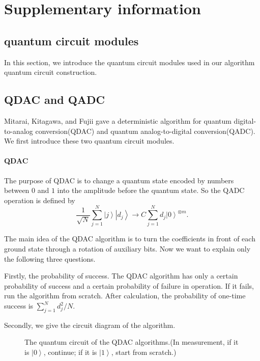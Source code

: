 \documentclass[%
 reprint,
 amsmath,amssymb,
pra,
]{revtex4-1}
\begin{document}
\clearpage

\section{Supplementary information}
\subsection{quantum circuit modules}
In this section, we introduce the quantum circuit modules used in our algorithm quantum circuit construction.


\subsection{QDAC and QADC}
Mitarai, Kitagawa, and Fujii \cite{mitarai2019quantum} gave a deterministic algorithm for quantum digital-to-analog conversion(QDAC) and quantum analog-to-digital conversion(QADC). We first introduce these two quantum circuit modules.
\paragraph{QDAC}

The purpose of QDAC is to change a quantum state encoded by numbers between $0$ and $1$ into the amplitude before the quantum state. So the QADC operation is defined by
\[\frac{1}{{\sqrt N }}\sum\limits_{j = 1}^N {\left| j \right\rangle \left| {{d_j}} \right\rangle  \to C\sum\limits_{j = 1}^N {{d_j}{{\left| 0 \right\rangle }^{ \otimes m}}} }. \]

The main idea of the QDAC algorithm is to turn the coefficients in front of each ground state through a rotation of auxiliary bits. Now we want to explain only the following three questions.

Firstly, the probability of success. The QDAC algorithm has only a certain probability of success and a certain probability of failure in operation. If it fails, run the algorithm from scratch. After calculation, the probability of one-time success is $\sum\nolimits_{j = 1}^N {d_j^2/N} $\cite{mitarai2019quantum}.

Secondly, we give the circuit diagram of the algorithm.

\begin{figure}[htbp]
  \caption{The quantum circuit of the QDAC algorithms.(In measurement, if it is $\left| 0 \right\rangle $, continue; if it is $\left| 1 \right\rangle $, start from scratch.)}
 \label{QDAC_qcir}
\end{figure}
\end{document}
